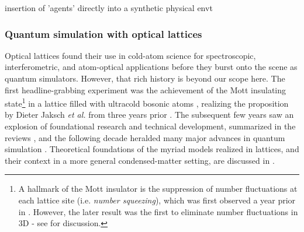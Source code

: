 
	insertion of 'agents' directly into a synthetic physical envt

\subsubsection{Quantum simulation with optical lattices}

	Optical lattices found their use in cold-atom science for spectroscopic, interferometric, and atom-optical applications before they burst onto the scene as quantum simulators.
	However, that rich history is beyond our scope here.
	The first headline-grabbing experiment was the achievement of the Mott insulating state\footnote{A hallmark of the Mott insulator is the suppression of number fluctuations at each lattice site (i.e.
	\emph{number squeezing}), which was first observed a year prior in \cite{Orzel01}.
	However, the later result was the first to eliminate number fluctuations in 3D - see \cite{Morsch06} for discussion.} in a lattice filled with ultracold bosonic atoms \cite{Greiner02}, realizing the proposition by Dieter Jaksch \emph{et al.} from three years prior \cite{Jaksch98}.
	 The subsequent few years saw an explosion of foundational research and technical development, summarized in the reviews \cite{Morsch06,Bloch08}, and the following decade heralded many major advances in quantum simulation \cite{Bloch12,Gross17}.
	Theoretical foundations of the myriad models realized in lattices, and their context in a more general condensed-matter setting, are discussed in \cite{LewensteinLattices, lewenstein07}.


